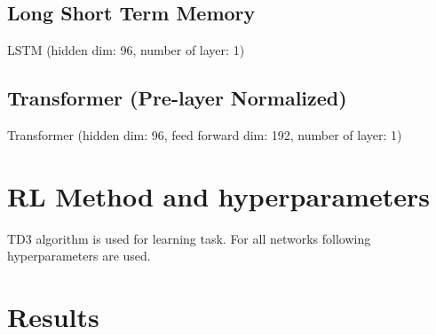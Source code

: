 \subsection{Long Short Term Memory}
LSTM (hidden dim: 96, number of layer: 1)

\subsection{Transformer (Pre-layer Normalized)}
Transformer (hidden dim: 96, feed forward dim: 192, number of layer: 1)

\section{RL Method and hyperparameters}
TD3 algorithm is used for learning task. For all networks following hyperparameters are used.\\

\section{Results}
